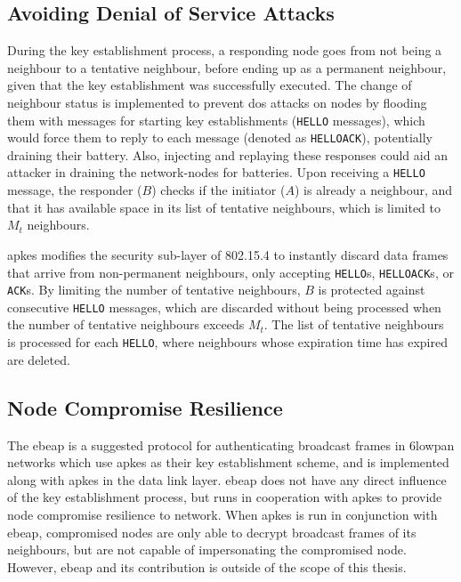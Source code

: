 \subsection{Avoiding Denial of Service Attacks}

During the key establishment process, a responding node goes from not being a neighbour to a tentative neighbour, before ending up as a permanent neighbour, given that the key establishment was successfully executed. The change of neighbour status is implemented to prevent \gls{dos} attacks on nodes by flooding them with messages for starting key establishments (\texttt{HELLO} messages), which would force them to reply to each message (denoted as \texttt{HELLOACK}), potentially draining their battery. Also, injecting and replaying these responses could aid an attacker in draining the network-nodes for batteries. Upon receiving a \texttt{HELLO} message, the responder ($B$) checks if the initiator ($A$) is already a neighbour, and that it has available space in its list of tentative neighbours, which is limited to $M_t$ neighbours. 

\gls{apkes} modifies the security sub-layer of 802.15.4 to instantly discard data frames that arrive from non-permanent neighbours, only accepting \texttt{HELLO}s, \texttt{HELLOACK}s, or \texttt{ACK}s. By limiting the number of tentative neighbours, $B$ is protected against consecutive \texttt{HELLO} messages, which are discarded without being processed when the number of tentative neighbours exceeds $M_t$. The list of tentative neighbours is processed for each \texttt{HELLO}, where neighbours whose expiration time has expired are deleted.

\subsection{Node Compromise Resilience}

The \gls{ebeap} is a suggested protocol for authenticating broadcast frames in \gls{6lowpan} networks which use \gls{apkes} as their key establishment scheme, and is implemented along with \gls{apkes} in the data link layer. \gls{ebeap} does not have any direct influence of the key establishment process, but runs in cooperation with \gls{apkes} to provide node compromise resilience to network. When \gls{apkes} is run in conjunction with \gls{ebeap}, compromised nodes are only able to decrypt broadcast frames of its neighbours, but are not capable of impersonating the compromised node. However, \gls{ebeap} and its contribution is outside of the scope of this thesis.

